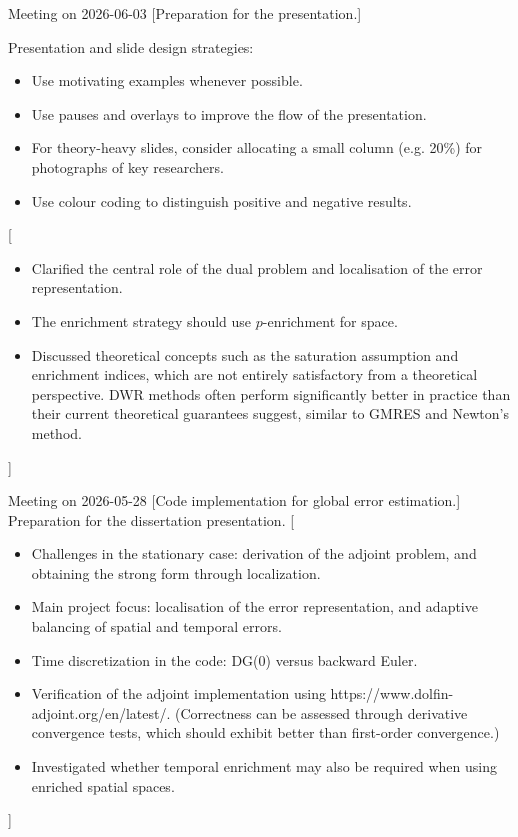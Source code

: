 \documentclass[11pt,a4paper]{article}
\begin{document}
\meet
{Meeting on 2026-06-03}
[Preparation for the presentation.]
{Presentation and slide design strategies:
\begin{itemize}
    \item Use motivating examples whenever possible.
    \item Use pauses and overlays to improve the flow of the presentation.
    \item For theory-heavy slides, consider allocating a small column (e.g. 20\%) for photographs of key researchers.
    \item Use colour coding to distinguish positive and negative results.
\end{itemize}
}
[\begin{itemize}
    \item Clarified the central role of the dual problem and localisation of the error representation.
    \item The enrichment strategy should use $p$-enrichment for space.
    \item Discussed theoretical concepts such as the saturation assumption and enrichment indices, which are not entirely satisfactory from a theoretical perspective. DWR methods often perform significantly better in practice than their current theoretical guarantees suggest, similar to GMRES and Newton's method.
\end{itemize}]
\vspace{1.5em}



\meet
{Meeting on 2026-05-28}
[Code implementation for global error estimation.]
{Preparation for the dissertation presentation.}
[\begin{itemize}
    \item Challenges in the stationary case: derivation of the adjoint problem, and obtaining the strong form through localization.
    \item Main project focus: localisation of the error representation, and adaptive balancing of spatial and temporal errors.
    \item Time discretization in the code: DG(0) versus backward Euler.
    \item Verification of the adjoint implementation using https://www.dolfin-adjoint.org/en/latest/. (Correctness can be assessed through derivative convergence tests, which should exhibit better than first-order convergence.)
    \item Investigated whether temporal enrichment may also be required when using enriched spatial spaces.
\end{itemize}
]
\vspace{1.5em}
\end{document}
